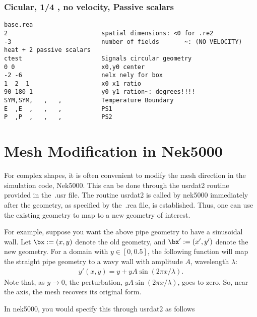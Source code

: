 \subsubsection{Cicular, 1/4 , no velocity, Passive scalars}
\begin{verbatim}base.rea
2                          spatial dimensions: <0 for .re2
-3                         number of fields       ~: (NO VELOCITY) heat + 2 passive scalars
ctest                      Signals circular geometry
0 0                        x0,y0 center
-2 -6                      nelx nely for box
1  2  1                    x0 x1 ratio
90 180 1                   y0 y1 ration~: degrees!!!!
SYM,SYM,   ,   ,           Temperature Boundary
E  ,E  ,   ,   ,           PS1
P  ,P  ,   ,   ,           PS2
\end{verbatim}


\section{Mesh Modification in Nek5000}

For complex shapes, it is often convenient to modify the mesh
direction in the simulation code, Nek5000.  This can be done
through the usrdat2 routine provided in the~.usr file.
The routine usrdat2 is called by nek5000 immediately after
the geometry, as specified by the~.rea file, is established.
Thus, one can use the existing geometry to map to a new geometry
of interest.

For example, suppose you want the above pipe geometry to have
a sinusoidal wall.  Let \(\bx := (x,y)\) denote the old geometry,
and \(\bx' := (x',y')\) denote the new geometry.  For a domain
with \(y\in [0,0.5]\), the following function will map the straight
pipe geometry to a wavy wall with amplitude \(A\), wavelength \(\lambda\):
\begin{eqnarray*}
  y'(x,y) = y  + y A \sin( 2 \pi x / \lambda ).
\end{eqnarray*}
Note that, as \(y \longrightarrow 0\), the perturbation, 
\(yA \sin( 2 \pi x / \lambda )\), goes to zero.  So, near the axis,
the mesh recovers its original form.

In nek5000, you would specify this through usrdat2 as follows


